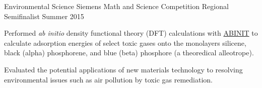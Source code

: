 
\begin{cventries}

  \cventry
    {Environmental Science} %
    {Siemens Math and Science Competition} %
    {Regional Semifinalist} %
    {Summer 2015} %
    {
      \begin{cvitems}
        \item{Performed \textit{ab initio} density functional theory (DFT) calculations with \href{https://abinit.org}{ABINIT} to calculate adsorption energies of select toxic gases onto the monolayers silicene, black (alpha) phosphorene, and blue (beta) phosphore (a theoredical alleotrope).}
        \item{Evaluated the potential applications of new materials technology to resolving environmental issues such as air pollution by toxic gas remediation.}
      \end{cvitems}
    }

\end{cventries}
